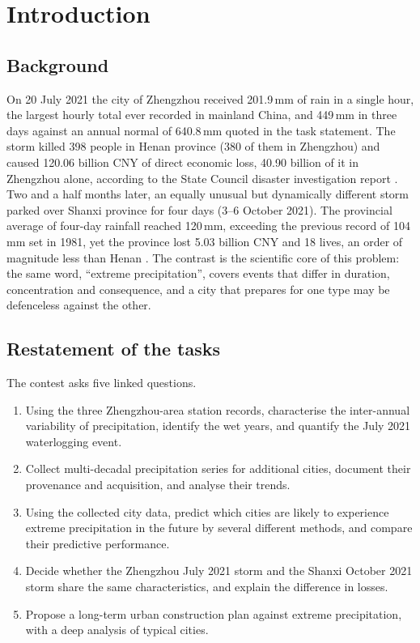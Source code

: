 \section{Introduction}

\subsection{Background}

On 20 July 2021 the city of Zhengzhou received 201.9\,mm of rain in a single hour, the largest hourly total ever recorded in mainland China, and 449\,mm in three days against an annual normal of 640.8\,mm quoted in the task statement. The storm killed 398 people in Henan province (380 of them in Zhengzhou) and caused 120.06 billion CNY of direct economic loss, 40.90 billion of it in Zhengzhou alone, according to the State Council disaster investigation report \cite{sc}. Two and a half months later, an equally unusual but dynamically different storm parked over Shanxi province for four days (3--6 October 2021). The provincial average of four-day rainfall reached 120\,mm, exceeding the previous record of 104\,mm set in 1981, yet the province lost 5.03 billion CNY and 18 lives, an order of magnitude less than Henan \cite{che2021,mem2021}. The contrast is the scientific core of this problem: the same word, ``extreme precipitation'', covers events that differ in duration, concentration and consequence, and a city that prepares for one type may be defenceless against the other.

\subsection{Restatement of the tasks}

The contest asks five linked questions.

\begin{enumerate}[leftmargin=1.4em,itemsep=1pt]
\item Using the three Zhengzhou-area station records, characterise the inter-annual variability of precipitation, identify the wet years, and quantify the July 2021 waterlogging event.
\item Collect multi-decadal precipitation series for additional cities, document their provenance and acquisition, and analyse their trends.
\item Using the collected city data, predict which cities are likely to experience extreme precipitation in the future by several different methods, and compare their predictive performance.
\item Decide whether the Zhengzhou July 2021 storm and the Shanxi October 2021 storm share the same characteristics, and explain the difference in losses.
\item Propose a long-term urban construction plan against extreme precipitation, with a deep analysis of typical cities.
\end{enumerate}


